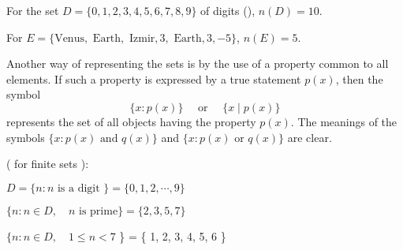 \documentclass[11pt]{amsbook}
\begin{document}
\begin{exmp} 
	\begin{hEnumerateArabic}
	
		\item 
		For the set $D = \{0, 1, 2, 3, 4, 5, 6, 7, 8, 9\}$ of digits 
		(), 
		$n(D) = 10$.
		
		\item 
		For $E = \{ \text{Venus}, \text{ Earth}, \text{ Izmir}, 
		3, \text{ Earth}, 3, -5 \}$, 
		$n(E) = 5$.
	\end{hEnumerateArabic}
\end{exmp}

Another way of representing the sets is 
by the use of a property common to all elements. 
If such a property is expressed by a true statement $p(x)$, 
then the symbol
\[
	\{ x: p(x) \} 
	\quad 
	\text{ or } 
	\quad
	\{ x \mid p(x) \}
\]
represents the set of all objects having the property $p(x)$.
The meanings of the symbols 
$\{ x: p(x) \text{ and } q(x) \}$ 
and 
$\{ x: p(x) \text{ or } q(x) \}$ 
are clear.

\begin{exmp} ( for finite sets ):
	\begin{hEnumerateArabic}
		
		\item 
		$D 
		= \{ n: n \text{ is a digit } \} 
		= \{ 0, 1, 2, \cdots, 9 \}$
		
		\item 
		$\{ n : n \in D, \quad n \text{ is prime} \} 
		= \{ 2, 3, 5, 7 \}$
		
		\item 
		$\{ n : n \in D, \quad 1 \leq n < 7$ \} 
		= \{ 1, 2, 3, 4, 5, 6 \}
	\end{hEnumerateArabic}
\end{exmp}
\end{document}
